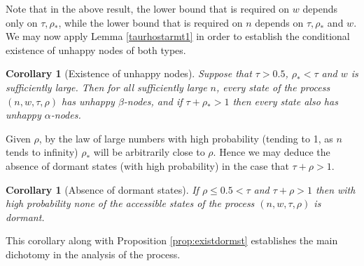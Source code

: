 \documentclass[11pt]{article}
\theoremstyle{plain}
\newtheorem{coro}[thm]{Corollary}
\numberwithin{equation}{subsection}
\begin{document}
Note that in the above result, the lower bound that is required on $w$ depends only on
$\tau, \rho_{\ast}$, while the lower bound that is required on $n$ 
depends on $\tau, \rho_{\ast}$ and $w$.
We may now apply Lemma  \ref{taurhostarmt1} in order to establish the conditional
existence of unhappy nodes of both types.

\begin{coro}[Existence of unhappy nodes]\label{coro:exiunhangen1}
Suppose that $\tau>0.5$, $\rho_{\ast}<\tau$  and $w$ is sufficiently large.
Then for
all sufficiently large $n$, every state of the process
$(n, w, \tau, \rho)$ has  unhappy $\beta$-nodes, and if $\tau+\rho_{\ast}>1$ 
then every state also has unhappy  $\alpha$-nodes.
\end{coro}

Given $\rho$, by the law of large numbers with high probability 
(tending to 1, as $n$ tends to infinity)
$\rho_{\ast}$ will be arbitrarily close to $\rho$. 
Hence we may deduce the absence of dormant states
(with high probability) in the case that $\tau+\rho>1$. 

\begin{coro}[Absence of dormant states]
If $\rho\leq 0.5<\tau$ and $\tau+\rho>1$  then
with high probability none of the accessible states of
the process $(n, w, \tau, \rho)$ is dormant.
\end{coro}

This corollary along with Proposition \ref{prop:existdormst}
establishes the main dichotomy in the analysis of the process.
\end{document}
